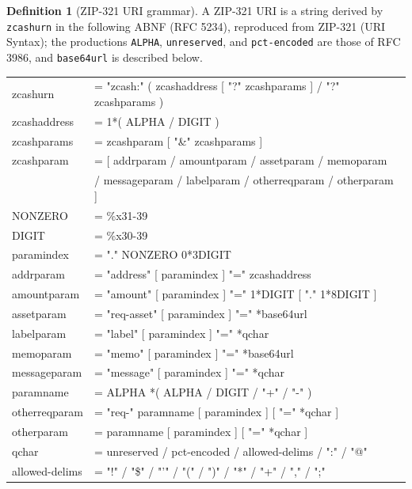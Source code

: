\documentclass[11pt,a4paper]{article}
\theoremstyle{definition}
\newtheorem{definition}[theorem]{Definition}
\begin{document}
\begin{definition}[ZIP-321 URI grammar]\label{def:zip321-grammar}
A ZIP-321 URI is a string derived by \texttt{zcashurn} in the following ABNF
(RFC 5234), reproduced from ZIP-321 (URI Syntax); the productions
\texttt{ALPHA}, \texttt{unreserved}, and \texttt{pct-encoded} are those of
RFC 3986, and \texttt{base64url} is described below.
\begin{center}\footnotesize\ttfamily
\begin{tabular}{@{}ll@{}}
zcashurn       & = "zcash:" ( zcashaddress [ "?" zcashparams ] / "?" zcashparams ) \\
zcashaddress   & = 1*( ALPHA / DIGIT ) \\
zcashparams    & = zcashparam [ "\&" zcashparams ] \\
zcashparam     & = [ addrparam / amountparam / assetparam / memoparam \\
               & \phantom{= [ }/ messageparam / labelparam / otherreqparam / otherparam ] \\
NONZERO        & = \%x31-39 \\
DIGIT          & = \%x30-39 \\
paramindex     & = "." NONZERO 0*3DIGIT \\
addrparam      & = "address" [ paramindex ] "=" zcashaddress \\
amountparam    & = "amount" [ paramindex ] "=" 1*DIGIT [ "." 1*8DIGIT ] \\
assetparam     & = "req-asset" [ paramindex ] "=" *base64url \\
labelparam     & = "label" [ paramindex ] "=" *qchar \\
memoparam      & = "memo" [ paramindex ] "=" *base64url \\
messageparam   & = "message" [ paramindex ] "=" *qchar \\
paramname      & = ALPHA *( ALPHA / DIGIT / "+" / "-" ) \\
otherreqparam  & = "req-" paramname [ paramindex ] [ "=" *qchar ] \\
otherparam     & = paramname [ paramindex ] [ "=" *qchar ] \\
qchar          & = unreserved / pct-encoded / allowed-delims / ":" / "@" \\
allowed-delims & = "!" / "\$" / "'" / "(" / ")" / "*" / "+" / "," / ";" \\
\end{tabular}
\end{center}
\end{definition}
\end{document}
